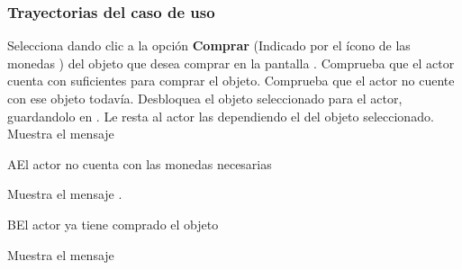 \subsubsection{Trayectorias del caso de uso}

\begin{UCtrayectoria}%
%

    \Actor Selecciona dando clic a la opción \textbf{Comprar} (Indicado por el ícono de las monedas \IUMonedas{}) del objeto que desea comprar en la pantalla .
    \Sistema Comprueba que el actor cuenta con suficientes  para comprar el objeto. 
    \Sistema Comprueba que el actor no cuente con ese objeto todavía. 
    \Sistema Desbloquea el objeto seleccionado para el actor, guardandolo en .
    \Sistema Le resta al actor las  dependiendo el  del objeto seleccionado.
    \Sistema Muestra el mensaje 

\end{UCtrayectoria}

\begin{UCtrayectoriaA}%
  {A}{El actor no cuenta con las monedas necesarias }

  \Sistema Muestra el mensaje  .

\end{UCtrayectoriaA}

\begin{UCtrayectoriaA}%
{B}{El actor ya tiene comprado el objeto}

    \Sistema Muestra el mensaje  

\end{UCtrayectoriaA}
